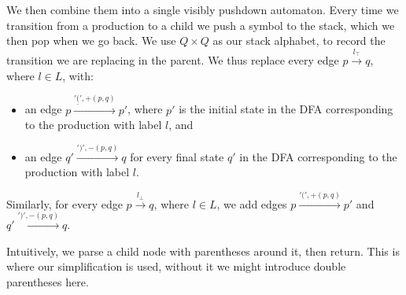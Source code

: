 \documentclass[acmsmall,review,anonymous]{acmart}\settopmatter{printfolios=true,printccs=false,printacmref=false}
\newcommand{\Labels}{L} %
\newcommand{\reqpl}{\underline{(}}
\newcommand{\reqpr}{)}
\newcommand{\pospl}{(}
\newcommand{\pospr}{)}
\begin{document}
\noindent We then combine them into a single visibly pushdown automaton. Every time we transition from a production to a child we push a symbol to the stack, which we then pop when we go back. We use $Q \times Q$ as our stack alphabet, to record the transition we are replacing in the parent. We thus replace every edge $p \xrightarrow{l_\top} q$, where $l \in \Labels$, with:

\begin{itemize}
  \item an edge $p \xrightarrow{'\reqpl', +(p, q)} p'$, where $p'$ is the initial state in the DFA corresponding to the production with label $l$, and
  \item an edge $q' \xrightarrow{'\reqpr', -(p, q)} q$ for every final state $q'$ in the DFA corresponding to the production with label $l$.
\end{itemize}

\noindent Similarly, for every edge $p \xrightarrow{l_\bot} q$, where $l \in \Labels$, we add edges $p \xrightarrow{'\pospl', +(p, q)} p'$ and $q' \xrightarrow{'\pospr', -(p, q)} q$.

Intuitively, we parse a child node with parentheses around it, then return. This is where our simplification is used, without it we might introduce double parentheses here.

\begin{center}
\end{center}
\end{document}
